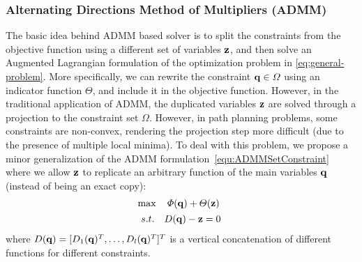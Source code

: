 \documentclass[journal]{IEEEtran}  %
\begin{document}
\subsubsection{Alternating Directions Method of Multipliers (ADMM)}\label{chapter:ADMM review}
The basic idea behind ADMM based solver \cite{zyang} is to split the constraints from the objective function using a different set of variables $\mathbf{z}$, and then solve an Augmented Lagrangian formulation of the optimization problem in \eqref{eq:general-problem}.
More specifically, we can rewrite the constraint $\mathbf{q}\in\varOmega$ using an indicator function $\varTheta$, and include it in the objective function. However, in the traditional application of ADMM, the duplicated variables $\mathbf{z}$ are solved through a projection to the constraint set $\Omega$. However, in path planning problems, some constraints are non-convex, rendering the projection step more difficult (due to the presence of multiple local minima).
To deal with this problem, we propose a minor generalization of the ADMM formulation~\eqref{equ:ADMMSetConstraint} where we allow $\mathbf{z}$ to replicate an arbitrary function of the main variables $\mathbf{q}$ (instead of being an exact copy): 
\begin{equation}\label{eq:ADMMSetConstraint_modified}
	\begin{aligned}
		&\max\quad \varPhi(\vq)+\varTheta(\vz) \\
		& \begin{array}{r@{\quad}c}
			s.t.& D(\vq)-\vz=0
		\end{array} 
	\end{aligned}
\end{equation}
where $D(\mathbf{q})= [D_1(\mathbf{q})^T,\dots,D_l(\mathbf{q})^T]^T$ is a vertical concatenation of different functions for different constraints.
\end{document}
